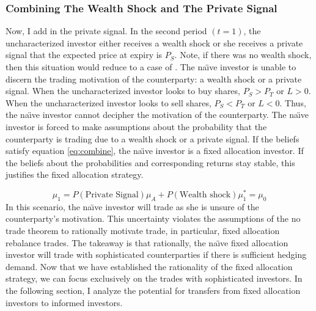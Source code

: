 \documentclass[12pt]{article}
\begin{document}


\subsubsection{Combining The Wealth Shock and The Private Signal} \label{subsec:combine}
Now, I add in the private signal. In the second period $(t=1)$, the uncharacterized investor either receives a wealth shock or she receives a private signal that the expected price at expiry is $P_S$. Note, if there was no wealth shock, then this situation would reduce to a case of \citet{MILGROM198217}. The na\"{\i}ve investor is unable to discern the trading motivation of the counterparty: a wealth shock or a private signal. When the uncharacterized investor looks to buy shares, $P_S > P_T$ or $L > 0$. When the uncharacterized investor looks to sell shares, $P_S < P_T$ or $L < 0$. Thus, the na\"{\i}ve investor cannot decipher the motivation of the counterparty. The na\"{\i}ve investor is forced to make assumptions about the probability that the counterparty is trading due to a wealth shock or a private signal. If the beliefs satisfy equation \eqref{eq:combine}, the na\"{\i}ve investor is a fixed allocation investor. If the beliefs about the probabilities and corresponding returns stay stable, this justifies the fixed allocation strategy. 

\begin{equation}
\mu_1 = P(\text{Private Signal})\mu_A + P(\text{Wealth shock})\mu_{1}^* = \mu_0
\label{eq:combine}
\end{equation}
In this scenario, the na\"{\i}ve investor will trade as she is unsure of the counterparty's motivation. This uncertainty violates the assumptions of the \citet{MILGROM198217} no trade theorem to rationally motivate trade, in particular, fixed allocation rebalance trades. The takeaway is that rationally, the na\"{\i}ve fixed allocation investor will trade with sophisticated counterparties if there is sufficient hedging demand. Now that we have established the rationality of the fixed allocation strategy, we can focus exclusively on the trades with sophisticated investors. In the following section, I analyze the potential for transfers from fixed allocation investors to informed investors.
\end{document}
